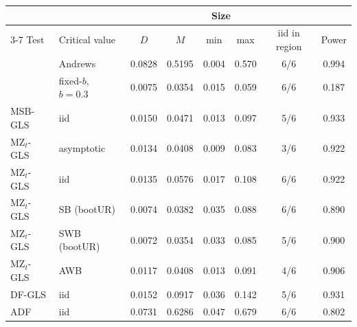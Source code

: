\begin{tabular}{llcccccc}
\toprule
& & \multicolumn{5}{c}{Size} & \\
\cmidrule(lr){3-7}
Test & Critical value & $D$ & $M$ & min & max & iid in region & Power \\
\midrule
\RMGLS{} & Andrews & 0.0828 & 0.5195 & 0.004 & 0.570 & 6/6 & 0.994 \\
\RMGLS{} & fixed-$b$, $b = 0.3$ & 0.0075 & 0.0354 & 0.015 & 0.059 & 6/6 & 0.187 \\
\addlinespace
MSB-GLS & iid & 0.0150 & 0.0471 & 0.013 & 0.097 & 5/6 & 0.933 \\
\addlinespace
MZ$_t$-GLS & asymptotic & 0.0134 & 0.0408 & 0.009 & 0.083 & 3/6 & 0.922 \\
MZ$_t$-GLS & iid & 0.0135 & 0.0576 & 0.017 & 0.108 & 6/6 & 0.922 \\
MZ$_t$-GLS & SB (bootUR) & 0.0074 & 0.0382 & 0.035 & 0.088 & 6/6 & 0.890 \\
MZ$_t$-GLS & SWB (bootUR) & 0.0072 & 0.0354 & 0.033 & 0.085 & 5/6 & 0.900 \\
MZ$_t$-GLS & AWB & 0.0117 & 0.0408 & 0.013 & 0.091 & 4/6 & 0.906 \\
\addlinespace
DF-GLS & iid & 0.0152 & 0.0917 & 0.036 & 0.142 & 5/6 & 0.931 \\
\addlinespace
ADF & iid & 0.0731 & 0.6286 & 0.047 & 0.679 & 6/6 & 0.802 \\
\bottomrule
\end{tabular}
